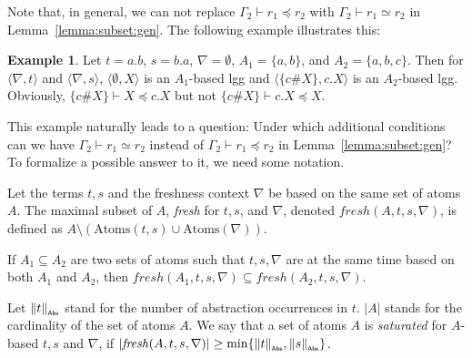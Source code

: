 \documentclass[11pt,a4paper]{amsart}
\theoremstyle{definition}
\newtheorem{example}{Example}
\newcommand{\np}[2]{\langle #1, \allowbreak #2\rangle}
\newcommand{\atoms}{\mathrm{Atoms}}
\newcommand{\abscard}[1]{\|#1\|_{_{\sf Abs}}}
\newcommand{\unused}{\mathit{fresh}}
\begin{document}
 Note that, in general, we can not replace $\Gamma_2\vdash r_1\preceq r_2$ with $\Gamma_2\vdash r_1\simeq r_2$ in Lemma~\ref{lemma:subset:gen}. The following example
 illustrates this:
 \begin{example}
  \label{exmp:subset:gen}
   Let $t = a.b$, $s= b.a$, $\nabla =\emptyset$, $A_1=\{a,b\}$, and
   $A_2=\{a,b,c\}$. Then for $\np{\nabla}{t}$ and $\np{\nabla}{s}$,
   $\np{\emptyset}{X}$ is an $A_1$-based lgg and $\np{\{c\#X\}}{c.X}$
   is an $A_2$-based lgg. Obviously, $\{c\#X\} \vdash X \preceq c.X$ but not $\{c\#X\} \vdash c.X \preceq X$.
 \end{example}

This example naturally leads to a question: Under which additional conditions can we have $\Gamma_2\vdash r_1\simeq r_2$ instead of $\Gamma_2\vdash r_1\preceq r_2$ in Lemma~\ref{lemma:subset:gen}? To formalize a possible answer to it, we need some notation.

Let the terms $t,s$ and the freshness context $\nabla$ be based on the same set of atoms $A$. The maximal subset of $A$, \emph{fresh} for $t,s$, and $\nabla$, denoted $\unused(A,t,s,\nabla)$, is defined as $A\setminus (\atoms(t,s) \cup \atoms(\nabla))$.


If $A_1\subseteq A_2$ are two sets of atoms such that $t,s,\nabla$ are at the same time based on both $A_1$ and $A_2$, then $\unused(A_1,t,s,\nabla)\subseteq \unused(A_2,t,s,\nabla)$.

Let $\abscard{t}$ stand for the number of abstraction occurrences in
$t$. $|A|$ stands for the cardinality of the set of atoms $A$. We say that a set of atoms $A$ is \emph{saturated} for $A$-based $t,s$ and $\nabla$, if $|\unused(A,t,s,\nabla)|\ge \min\{\abscard{t},\abscard{s}\}$.
\end{document}
